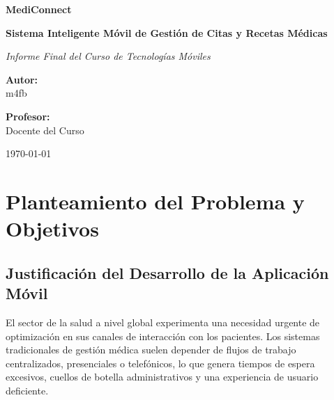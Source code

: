 \documentclass[12pt,a4paper]{report}
\begin{document}
\begin{titlepage}
    \centering
    \vspace*{2cm}
    {\Huge\bfseries MediConnect\par}
    \vspace{0.5cm}
    {\large\bfseries Sistema Inteligente Móvil de Gestión de Citas y Recetas Médicas\par}
    \vspace{2cm}
    {\Large\itshape Informe Final del Curso de Tecnologías Móviles\par}
    \vspace{4cm}
    \begin{minipage}{0.4\textwidth}
        \begin{flushleft} \large
            \textbf{Autor:}\\
            m4fb
        \end{flushleft}
    \end{minipage}
    \hfill
    \begin{minipage}{0.4\textwidth}
        \begin{flushright} \large
            \textbf{Profesor:}\\
            Docente del Curso
        \end{flushright}
    \end{minipage}
    \vfill
    {\large \today \par}
\end{titlepage}

\tableofcontents
\newpage

\chapter{Planteamiento del Problema y Objetivos}

\section{Justificación del Desarrollo de la Aplicación Móvil}
El sector de la salud a nivel global experimenta una necesidad urgente de optimización en sus canales de interacción con los pacientes. Los sistemas tradicionales de gestión médica suelen depender de flujos de trabajo centralizados, presenciales o telefónicos, lo que genera tiempos de espera excesivos, cuellos de botella administrativos y una experiencia de usuario deficiente. 
\end{document}
